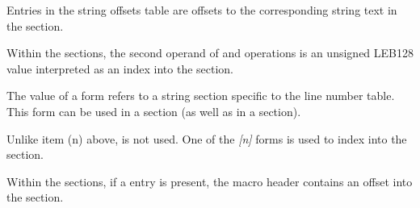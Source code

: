\begin{description}
\bb
{}
Entries in the string offsets table are offsets to the corresponding string text
in the \dotdebugstrdwo{} section.


Within the \dotdebugmacrodwo{} sections, the second operand of \DWMACROdefinestrx{}
and \DWMACROundefstrx{} operations is an unsigned LEB128 value interpreted as an
index into the \dotdebugstroffsetsdwo{} section.
\db

\bb
{}
The value of a \DWFORMlinestrp{} form refers to a string section specific
to the line number table. This form can be used in a \dotdebugline{} section
(as well as in a \dotdebuginfo{} section).
\eb

\bb
{}
Unlike item (n) above, \DWFORMlinestrp{} is not used. One of the \DWFORMstrx\textit{[n]}
forms is used to index into the \dotdebugstroffsetsdwo{} section.
\eb

%

Within the \dotdebugmacrodwo{} sections, if a \DWMACROstartfile{} entry is present,
the macro header contains an offset into the \dotdebuglinedwo{} section.

\eb

\end{description}